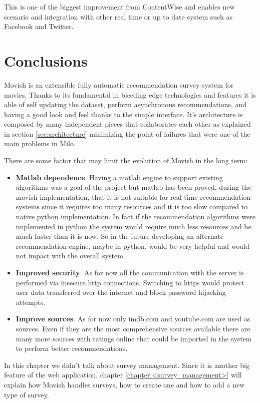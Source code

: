 This is one of the biggest improvement from ContentWise \cite{ContentWise} and enables new scenario and integration with other real time or up to date system such as Facebook and Twitter.

\section{Conclusions}
\label{sec:movish_system_conclusions}

Movish is an extensible fully automatic recommendation survey system for movies. Thanks to its fundamental in bleeding edge technologies and features it is able of self updating the dataset, perform asynchronous recommendations, and having a good look and feel thanks to the simple interface. It's architecture is composed by many independent pieces that collaborates each other as explained in section \ref{sec:architecture} minimizing the point of failures that were one of the main problems in Milo. 

There are some factor that may limit the evolution of Movish in the long term:

\begin{itemize}
\item \textbf{Matlab dependence}. Having a matlab engine to support existing algorithms was a goal of the project but matlab has been proved, during the movish implementation, that it is not suitable for real time recommendation systems since it requires too many resources and it is too slow compared to native python implementation. In fact if the recommendation algorithms were implemented in python the system would require much less resources and be much faster than it is now. So in the future developing an alternate recommendation engine, maybe in python, would be very helpful and would not impact with the overall system.
\item \textbf{Improved security}. As for now all the communication with the server is performed via insecure \ac{http} connections. Switching to \ac{https} would protect user data transferred over the internet and block password hijacking attempts.
\item \textbf{Improve sources}. As for now only imdb.com and youtube.com are used as sources. Even if they are the most comprehensive sources available there are many more sources with ratings online that could be imported in the system to perform better recommendations.
\end{itemize}

In this chapter we didn't talk about survey management. Since it is another big feature of the web application, chapter \ref{chapter:<survey_management>} will explain how Movish handles surveys, how to create one and how to add a new type of survey.

\acresetall